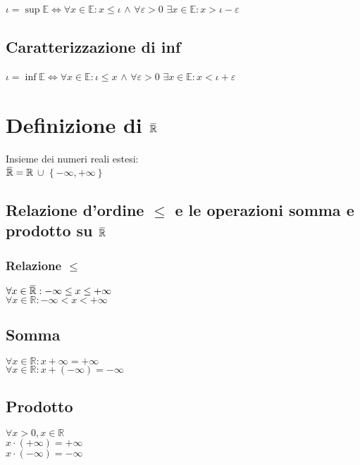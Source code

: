 \documentclass[a4paper, twoside, italian, 11pt]{book}
\newcommand{\braces}[1] {\left \{ #1 \right \}}
\newcommand{\overbar}[1] {\mkern 1.5mu\overline{\mkern-1.5mu#1\mkern-1.5mu}\mkern 1.5mu}
\newcommand{\R}{\mathbb{R}}
\newcommand{\E}{\mathbb{E}}
\begin{document}
\noindent
$\iota = \sup \E \iff \forall x \in \E : x \leq \iota$ $\land$ $\forall \varepsilon > 0$ $\exists x \in \E : x > \iota - \varepsilon$


\subsection{Caratterizzazione di inf}

\noindent
$\iota = \inf \E \iff \forall x \in \E : \iota \leq x$ $\land$ $\forall \varepsilon > 0$ $\exists x \in \E : x < \iota + \varepsilon$



\section{Definizione di $\overbar\R$}

\noindent
Insieme dei numeri reali estesi: \\
$\overbar\R = \R$ $\cup$ $\braces{-\infty, +\infty}$


\subsection {Relazione d'ordine $\leq$ e le operazioni somma e prodotto su $\overbar\R$}


\subsubsection{Relazione $\leq$}

\noindent
$\forall x \in \overbar\R: -\infty \leq x \leq +\infty$ \\
$\forall x \in \R: -\infty < x < +\infty$


\subsection{Somma}

\noindent
$\forall x \in \R: x + \infty = +\infty$ \\
$\forall x \in \R: x + (-\infty) = -\infty$


\subsection{Prodotto}

\noindent
$\forall x > 0, x \in \R$ \\
$x \cdot (+\infty) = +\infty$ \\
$x \cdot (-\infty) = -\infty$ \\
\end{document}
